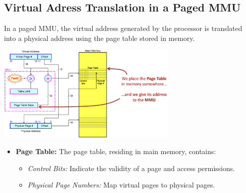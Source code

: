 \subsection{Virtual Adress Translation in a Paged MMU}
In a paged MMU, the virtual address generated by the processor is translated into a physical address using the page table stored in memory.
\begin{center}
    \includegraphics[width=0.65\textwidth]{chapters/chapter3c/images/pagedmmu.png}
\end{center}

\begin{itemize}
    \item[] \textbf{Page Table:}
    The page table, residing in main memory, contains:
    \begin{itemize}
        \item \textit{Control Bits:} Indicate the validity of a page and access permissions.
        \item \textit{Physical Page Numbers:} Map virtual pages to physical pages.
    \end{itemize}
\end{itemize}

